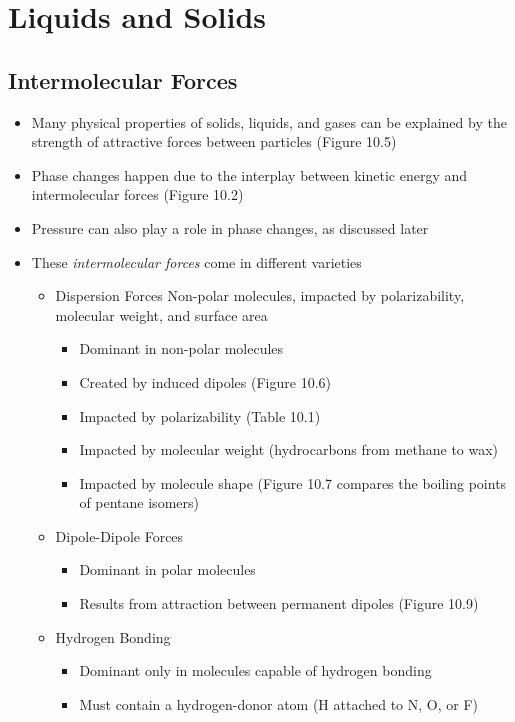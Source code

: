 \documentclass[12pt, openany, letterpaper]{memoir}
\begin{document}
\chapter{Liquids and Solids}

\section{Intermolecular Forces}
\begin{itemize}
  \item Many physical properties of solids, liquids, and gases can be explained by the strength of attractive forces between particles (Figure 10.5)
  \item Phase changes happen due to the interplay between kinetic energy and intermolecular forces (Figure 10.2)
  \item Pressure can also play a role in phase changes, as discussed later
  \item These \emph{intermolecular forces} come in different varieties
  \begin{itemize}
    \item Dispersion Forces Non-polar molecules, impacted by polarizability, molecular weight, and surface area
    \begin{itemize}
      \item Dominant in non-polar molecules
      \item Created by induced dipoles (Figure 10.6)
      \item Impacted by polarizability (Table 10.1)
      \item Impacted by molecular weight (hydrocarbons from methane to wax)
      \item Impacted by molecule shape (Figure 10.7 compares the boiling points of pentane isomers)
    \end{itemize}
    \item Dipole-Dipole Forces
    \begin{itemize}
      \item Dominant in polar molecules
      \item Results from attraction between permanent dipoles (Figure 10.9)
    \end{itemize}
  \item Hydrogen Bonding
    \begin{itemize}
      \item Dominant only in molecules capable of hydrogen bonding
      \item Must contain a hydrogen-donor atom (H attached to N, O, or F)

\end{itemize}
\end{itemize}
\end{itemize}
\end{document}
